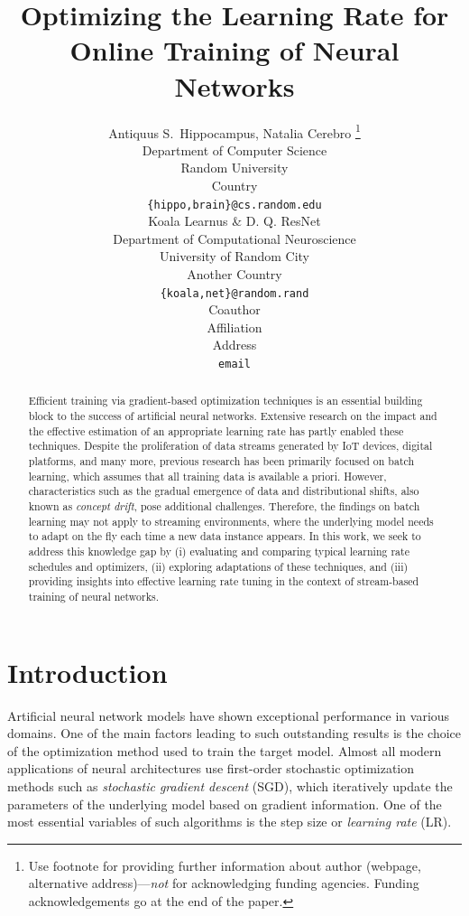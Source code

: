 \documentclass{article} %
\title{Optimizing the Learning Rate for Online Training of Neural Networks}
\author{Antiquus S.~Hippocampus, Natalia Cerebro  \thanks{ Use footnote for providing further information
about author (webpage, alternative address)---\emph{not} for acknowledging
funding agencies.  Funding acknowledgements go at the end of the paper.} \\
Department of Computer Science\\
Random University\\
Country \\
\texttt{\{hippo,brain\}@cs.random.edu} \\
\And %
Koala Learnus \& D. Q. ResNet  \\
Department of Computational Neuroscience \\
University of Random City \\
Another Country \\
\texttt{\{koala,net\}@random.rand} \\
\AND %
Coauthor \\
Affiliation \\
Address \\
\texttt{email}
}
\begin{document}
\maketitle

\begin{abstract}
   Efficient training via gradient-based optimization techniques is an essential building block to the success of artificial neural networks. Extensive research on the impact and the effective estimation of an appropriate learning rate has partly enabled these techniques. Despite the proliferation of data streams generated by IoT devices, digital platforms, and many more, previous research has been primarily focused on batch learning, which assumes that all training data is available a priori. However, characteristics such as the gradual emergence of data and distributional shifts, also known as \textit{concept drift}, pose additional challenges. Therefore, the findings on batch learning may not apply to streaming environments, where the underlying model needs to adapt on the fly each time a new data instance appears. In this work, we seek to address this knowledge gap by (i) evaluating and comparing typical learning rate schedules and optimizers, (ii) exploring adaptations of these techniques, and (iii) providing insights into effective learning rate tuning in the context of stream-based training of neural networks.
\end{abstract}

\section{Introduction}
Artificial neural network models have shown exceptional performance in various domains.
One of the main factors leading to such outstanding results is the choice of the optimization method used to train the target model.
Almost all modern applications of neural architectures use first-order stochastic optimization methods such as \textit{stochastic gradient descent} (SGD), which iteratively update the parameters of the underlying model based on gradient information.
One of the most essential variables of such algorithms is the step size or \textit{learning rate} (LR).
\end{document}
